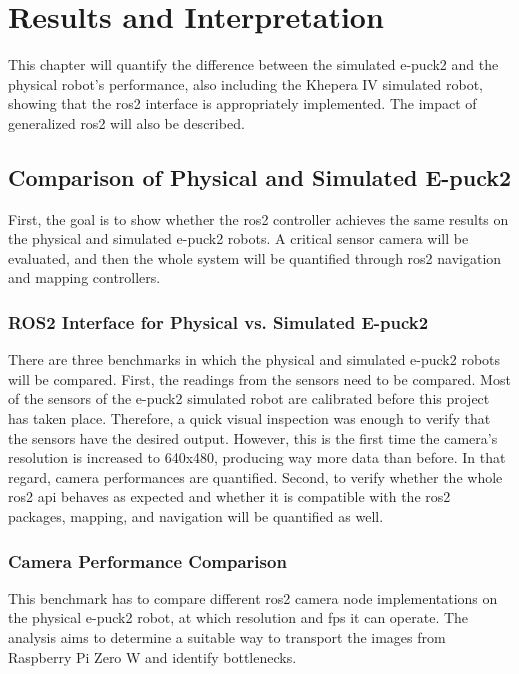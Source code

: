 \chapter{Results and Interpretation}
\label{chap:results}

This chapter will quantify the difference between the simulated e-puck2  and the physical robot's performance, also including the Khepera IV simulated robot, showing that the \ac{ros2} interface is appropriately implemented. 
The impact of generalized \ac{ros2} will also be described. 

\section{Comparison of Physical and Simulated E-puck2}

First, the goal is to show whether the \ac{ros2} controller achieves the same results on the physical and simulated e-puck2 robots.
A critical sensor camera will be evaluated, and then the whole system will be quantified through \ac{ros2} navigation and mapping controllers.

\subsection{ROS2 Interface for Physical vs. Simulated E-puck2}

There are three benchmarks in which the physical and simulated e-puck2 robots will be compared.
First, the readings from the sensors need to be compared. Most of the sensors of the e-puck2 simulated robot are calibrated before this project has taken place.
Therefore, a quick visual inspection was enough to verify that the sensors have the desired output.
However, this is the first time the camera's resolution is increased to 640x480, producing way more data than before.
In that regard, camera performances are quantified.
Second, to verify whether the whole \ac{ros2} \ac{api} behaves as expected and whether it is compatible with the \ac{ros2} packages, mapping, and navigation will be quantified as well.


\subsection{Camera Performance Comparison}
This benchmark has to compare different \ac{ros2} camera node implementations on the physical e-puck2 robot, at which resolution and \ac{fps} it can operate.
The analysis aims to determine a suitable way to transport the images from Raspberry Pi Zero W and identify bottlenecks.

